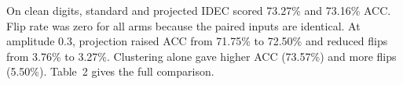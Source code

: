 On clean digits, standard and projected IDEC scored 73.27\% and 73.16\% ACC. Flip rate was zero for all arms because the paired inputs are identical. At amplitude 0.3, projection raised ACC from 71.75\% to 72.50\% and reduced flips from 3.76\% to 3.27\%. Clustering alone gave higher ACC (73.57\%) and more flips (5.50\%). Table~2 gives the full comparison.
